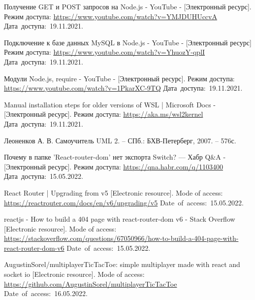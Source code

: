 \documentclass[12pt, a4paper, simple]{eskdtext}
\begin{document}
      \renewcommand{\addcontentsline}[3]{}%
      \renewcommand{\section}[2]{}%
    
      \begin{thebibliography}{}
        Получение GET и POST запросов на Node.js - YouTube
        - [Электронный ресурс].
        Режим доступа: \url{https://www.youtube.com/watch?v=YMJDUHUccvA}
        Дата~доступа:~19.11.2021.

        Подключение к базе данных MySQL в Node.js - YouTube
        - [Электронный ресурс]
        Режим доступа: \url{https://www.youtube.com/watch?v=YhuozY-qplI}
        Дата~доступа:~19.11.2021.

        Модули Node.js, require - YouTube
        - [Электронный ресурс].
        Режим доступа: \url{https://www.youtube.com/watch?v=1PkarXC-9TQ}
        Дата~доступа:~19.11.2021.

        Manual installation steps for older versions of WSL | Microsoft Docs
        - [Электронный ресурс].
        Режим доступа: \url{https://aka.ms/wsl2kernel}
        Дата~доступа:~19.11.2021.

        Леоненков А. В.
        Самоучитель UML 2. -- СПб.: БХВ-Петерберг, 2007. -- 576с.

        Почему в папке 'React-router-dom' нет экспорта Switch? — Хабр Q\&A
        - [Электронный ресурс].
        Режим доступа: \url{https://qna.habr.com/q/1103400}
        Дата~доступа:~15.05.2022.

        React Router | Upgrading from v5
        [Electronic resource].
        Mode of access: \url{https://reactrouter.com/docs/en/v6/upgrading/v5}
        Date~of~access:~15.05.2022.

        reactjs - How to build a 404 page with react-router-dom v6 - Stack Overflow
        [Electronic resource].
        Mode of access: \url{https://stackoverflow.com/questions/67050966/how-to-build-a-404-page-with-react-router-dom-v6}
        Date~of~access:~15.05.2022.

        AugustinSorel/multiplayerTicTacToe: simple multiplayer made with react and socket io
        [Electronic resource].
        Mode of access: \url{https://github.com/AugustinSorel/multiplayerTicTacToe}
        Date~of~access:~16.05.2022.
      \end{thebibliography}
    \endgroup
    \newpage
\end{document}
